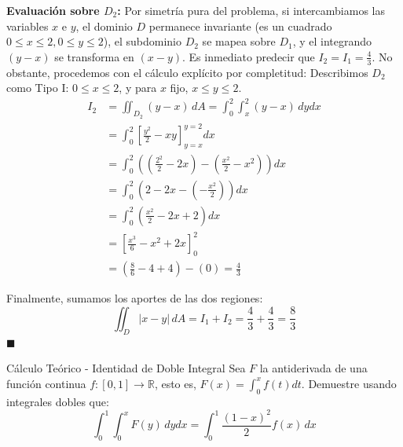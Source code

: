 \documentclass[11pt,a4paper]{article}
\begin{document}
\textbf{Evaluación sobre $D_2$:}
Por simetría pura del problema, si intercambiamos las variables $x$ e $y$, el dominio $D$ permanece invariante (es un cuadrado $0\le x \le 2, 0\le y \le 2$), el subdominio $D_2$ se mapea sobre $D_1$, y el integrando $(y-x)$ se transforma en $(x-y)$. Es inmediato predecir que $I_2 = I_1 = \frac{4}{3}$. No obstante, procedemos con el cálculo explícito por completitud:
Describimos $D_2$ como Tipo I: $0 \leq x \leq 2$, y para $x$ fijo, $x \leq y \leq 2$.
\begin{align*}
I_2 &= \iint_{D_2} (y - x) \, dA = \int_0^2 \int_x^2 (y - x) \, dy dx \\
    &= \int_0^2 \left[ \frac{y^2}{2} - xy \right]_{y=x}^{y=2} dx \\
    &= \int_0^2 \left( \left( \frac{2^2}{2} - 2x \right) - \left( \frac{x^2}{2} - x^2 \right) \right) dx \\
    &= \int_0^2 \left( 2 - 2x - \left( -\frac{x^2}{2} \right) \right) dx \\
    &= \int_0^2 \left( \frac{x^2}{2} - 2x + 2 \right) dx \\
    &= \left[ \frac{x^3}{6} - x^2 + 2x \right]_0^2 \\
    &= \left( \frac{8}{6} - 4 + 4 \right) - (0) = \frac{4}{3}
\end{align*}

Finalmente, sumamos los aportes de las dos regiones:
\[
\iint_D |x - y| \, dA = I_1 + I_2 = \frac{4}{3} + \frac{4}{3} = \frac{8}{3}
\]
$\blacksquare$

\begin{ejerciciobox}{Cálculo Teórico - Identidad de Doble Integral}{}
    Sea $F$ la antiderivada de una función continua $f: [0,1] \to \mathbb{R}$, esto es, $F(x) = \int_0^x f(t) dt$. Demuestre usando integrales dobles que:
    \[
    \int_0^1 \int_0^x F(y) \, dy dx = \int_0^1 \frac{(1-x)^2}{2} f(x) \, dx
    \]
\end{ejerciciobox}
\end{document}
